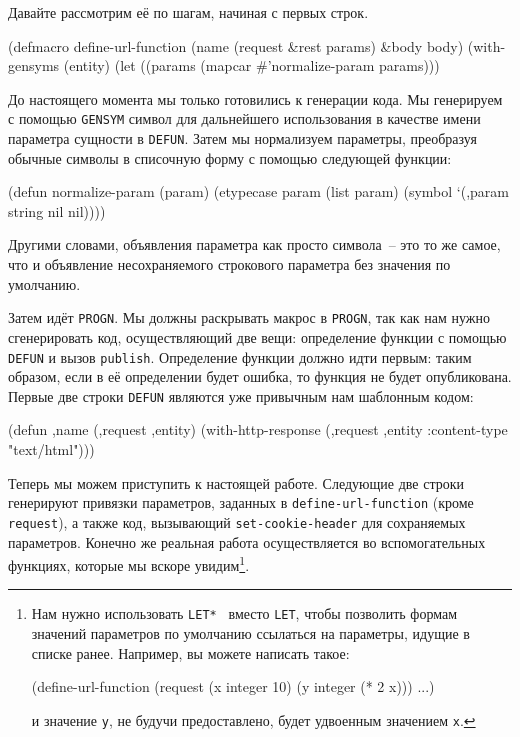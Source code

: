 Давайте рассмотрим её по шагам, начиная с первых строк.

\begin{myverb}
(defmacro define-url-function (name (request &rest params) &body body)
  (with-gensyms (entity)
    (let ((params (mapcar #'normalize-param params)))
\end{myverb}

До настоящего момента мы только готовились к генерации кода. Мы генерируем с помощью
\lstinline{GENSYM} символ для дальнейшего использования в качестве имени параметра сущности в
\lstinline{DEFUN}. Затем мы нормализуем параметры, преобразуя обычные символы в списочную
форму с помощью следующей функции:

\begin{myverb}
(defun normalize-param (param)
  (etypecase param
    (list param)
    (symbol `(,param string nil nil))))
\end{myverb}

Другими словами, объявления параметра как просто символа~-- это то же самое, что и
объявление несохраняемого строкового параметра без значения по умолчанию.

Затем идёт \lstinline{PROGN}. Мы должны раскрывать макрос в \lstinline{PROGN}, так как нам нужно
сгенерировать код, осуществляющий две вещи: определение функции с помощью \lstinline{DEFUN} и
вызов \lstinline{publish}. Определение функции должно идти первым: таким образом, если в её
определении будет ошибка, то функция не будет опубликована. Первые две строки
\lstinline{DEFUN} являются уже привычным нам шаблонным кодом:

\begin{myverb}
(defun ,name (,request ,entity)
  (with-http-response (,request ,entity :content-type "text/html")))
\end{myverb}

Теперь мы можем приступить к настоящей работе. Следующие две строки генерируют привязки
параметров, заданных в \lstinline{define-url-function} (кроме \lstinline{request}), а также код,
вызывающий \lstinline{set-cookie-header} для сохраняемых параметров. Конечно же реальная работа
осуществляется во вспомогательных функциях, которые мы вскоре увидим\footnote{Нам нужно
  использовать \lstinline{LET* } вместо \lstinline{LET}, чтобы позволить формам значений
  параметров по умолчанию ссылаться на параметры, идущие в списке ранее. Например, вы
  можете написать такое:

\begin{myverb}
(define-url-function (request (x integer 10) (y integer (* 2 x))) ...)
\end{myverb}

\noindent{}и значение \lstinline{y}, не будучи предоставлено, будет удвоенным значением \lstinline{x}.}\hspace{\footnotenegspace}.

